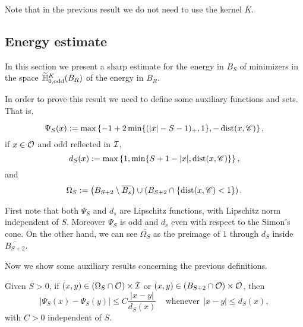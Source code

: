 Note that in the previous result we do not need to use the kernel $\overline{K}$. 


\subsection{Energy estimate}

In this section we present a sharp estimate for the energy in $B_S$ of minimizers in the space $\widetilde{\mathbb{H}}^K_{0, \textrm{odd}}(B_R)$ of the energy in $B_R$.

In order to prove this result we need to define some auxiliary functions and sets. That is,

$$ \Psi_S(x) := \max\left\{-1+2\min\{(|x|-S-1)_+,1\},-\operatorname{dist}(x,\mathscr{C}) \right\},  $$
if $x\in \mathcal{O}$ and odd reflected in $\mathcal{I}$,
$$ d_S(x) := \max\left\{1,\min\{S+1-|x|,\operatorname{dist}(x,\mathscr{C})\} \right\},  $$
and
$$ \Omega_S := \left( B_{S+2}\setminus \overline{B_s} \right) \cup \left( B_{S+2} \cap \{\operatorname{dist}(x,\mathscr{C})< 1\}\right). $$

First note that both $\Psi_S$ and $d_s$ are Lipschitz functions, with Lipschitz norm independent of $S$. Moreover $\Psi_S$ is odd and $d_s$ even with respect to the Simon's cone. On the other hand, we can see $\overline{\Omega_S}$ as the preimage of $1$ through $d_S$ inside $\overline{B_{S+2}}$.

Now we show some auxiliary results concerning the previous definitions.

\begin{lemma}
\label{Lemma: AdaptedLipschitzConditionWith_dFunction}
Given $S>0$, if $(x,y) \in \left(\Omega_S\cap \mathcal{O}\right) \times \mathcal{I}$ or $(x,y)\in \left(B_{S+2}\cap \mathcal{O}\right) \times \mathcal{O}$, then
$$ |\Psi_S(x) - \Psi_S(y)| \leq C \frac{|x-y|}{d_S(x)} \ \ \ \ \ \textrm{whenever} \ \ |x-y|\leq d_S(x), $$
with $C>0$ independent of $S$.
\end{lemma}

